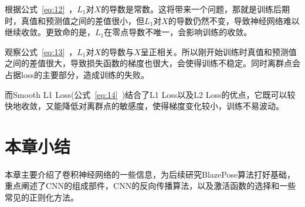 根据公式~\ref{eq:12}~，$L_1$对$X$的导数是常数。这将带来一个问题，那就是训练后期时，真值和预测值之间的差值很小，但$L_1$对$X$的导数仍然不变，导致神经网络难以继续收敛。更致命的是，$L_1$在零点导数不唯一，会影响训练的收敛。

观察公式~\ref{eq:13}~，$L_1$对$X$的导数与$X$呈正相关。所以刚开始训练时真值和预测值之间的差值很大，导致损失函数的梯度也很大，会使得训练不稳定。同时离群点会占据loss的主要部分，造成训练的失败。

而Smooth L1 Loss(公式~\ref{eq:14}~)结合了L1 Loss以及L2 Loss的优点，它既可以较快地收敛，又能降低对离群点的敏感度，使得梯度变化较小，训练不易波动。

\section{本章小结}

本章主要介绍了卷积神经网络的一些信息，为后续研究BlazePose算法打好基础，重点阐述了CNN的组成部件，CNN的反向传播算法，以及激活函数的选择和一些常见的正则化方法。



